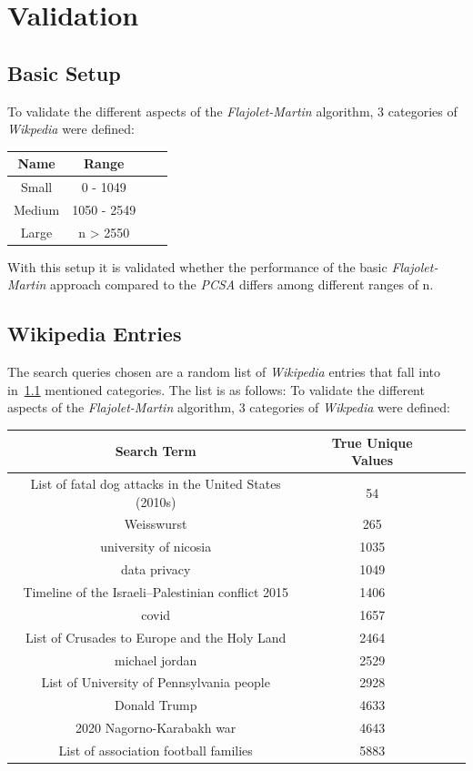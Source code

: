 \documentclass[11pt]{article}
\begin{document}
\section{Validation}
\subsection{Basic Setup}
\label{subsec:bassetup}
To validate the different aspects of the \emph{Flajolet-Martin} algorithm, 3 categories of \emph{Wikpedia} were defined:
\begin{center}
 \begin{tabular}{||c c c c||} 
 \hline
 Name & Range \\ [0.5ex] 
 \hline\hline
 Small & 0 - 1049 \\ 
 \hline
 Medium & 1050 - 2549 \\
 \hline
 Large & n > 2550 \\
 \hline
\end{tabular}
\end{center}
With this setup it is validated whether the performance of the basic \emph{Flajolet-Martin} approach compared to the \emph{PCSA} differs among different ranges of n.

\subsection{Wikipedia Entries}
The search queries chosen are a random list of \emph{Wikipedia} entries that fall into in~\ref{subsec:bassetup} mentioned categories. The list is as follows:
To validate the different aspects of the \emph{Flajolet-Martin} algorithm, 3 categories of \emph{Wikpedia} were defined:
\begin{center}
 \begin{tabular}{||c c c c||} 
 \hline
 Search Term & True Unique Values \\ [0.5ex] 
 \hline\hline
 List of fatal dog attacks in the United States (2010s) & 54  \\ 
 \hline
 Weisswurst & 265 \\
 \hline
 university of nicosia & 1035 \\
 \hline
data privacy & 1049 \\ 
 \hline
 Timeline of the Israeli–Palestinian conflict 2015 & 1406 \\
 \hline
covid & 1657 \\
 \hline
List of Crusades to Europe and the Holy Land & 2464 \\ 
 \hline
 michael jordan & 2529 \\
 \hline
 List of University of Pennsylvania people & 2928 \\
 \hline
Donald Trump & 4633 \\ 
 \hline
2020 Nagorno-Karabakh war & 4643 \\
 \hline
List of association football families & 5883 \\
 \hline   
 \end{tabular}
 \end{center}
\end{document}
